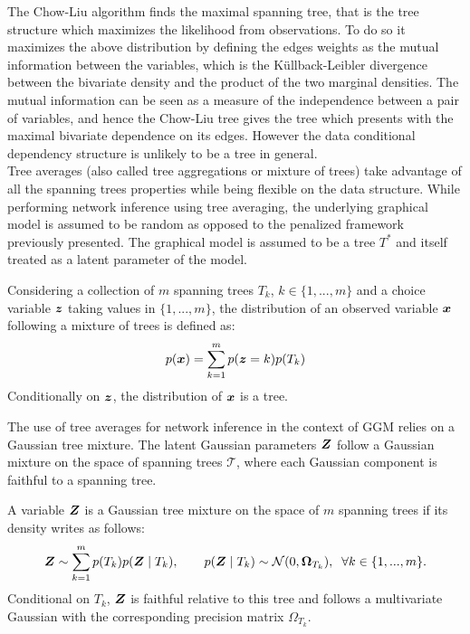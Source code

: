 The Chow-Liu algorithm \citep{ChowLiu} finds the maximal spanning tree, that is the tree structure which maximizes the likelihood from observations. To do so it maximizes the above distribution by defining the edges weights as the mutual information between the variables, which is the Küllback-Leibler divergence between the bivariate density and the product of the two marginal densities. The mutual information can be seen as a measure of the independence between a pair of variables, and hence the Chow-Liu tree gives the tree which presents with the maximal bivariate dependence on its edges. However the data conditional dependency structure is unlikely to be a tree in general. \\

Tree averages (also called tree aggregations or mixture of trees) take advantage of all the spanning trees properties while being flexible on the data structure. While performing network inference using tree averaging,  the underlying graphical model is assumed to be random as opposed to the penalized framework previously presented.  The graphical model is assumed to be a tree $T^*$ and itself treated as a latent parameter of the model.
 
 \begin{definition}
 Considering a collection of $m$ spanning trees $T_k$, $k\in\{1,...,m\}$ and a choice variable ${\boldsymbol{z}}$ taking values in $\{1,...,m\}$, the distribution of an observed variable ${\boldsymbol{x}}$ following a  mixture of trees  is defined as:
$$ p({\boldsymbol{x}}) = \sum_{k=1}^m p({\boldsymbol{z}}=k) p(T_k)$$
Conditionally on ${\boldsymbol{z}}$, the distribution of ${\boldsymbol{x}}$ is a tree.
 \end{definition}


The use of tree averages for network inference in the context of GGM relies on a Gaussian tree mixture. The latent Gaussian parameters ${\boldsymbol{Z}}$ follow a Gaussian mixture on the space of spanning trees $\mathcal{T}$, where each Gaussian component is faithful to a spanning tree.
\begin{definition}\label{treemixt}
A variable ${\boldsymbol{Z}}$ is a Gaussian tree mixture on the space of $m$ spanning trees if its density writes as follows:
$${\boldsymbol{Z}} \sim \sum_{k=1}^m  p(T_k) p({\boldsymbol{Z}}\mid T_k),\qquad  p({\boldsymbol{Z}}\mid T_k)\sim\mathcal{N} (0, {\boldsymbol{\Omega}}_{T_k}), \;\; \forall k\in\{1,...,m\}.$$
Conditional on $T_k$, ${\boldsymbol{Z}}$ is faithful relative to this tree and follows a multivariate Gaussian with the corresponding precision matrix $\Omega_{T_k}$.
\end{definition}
 
